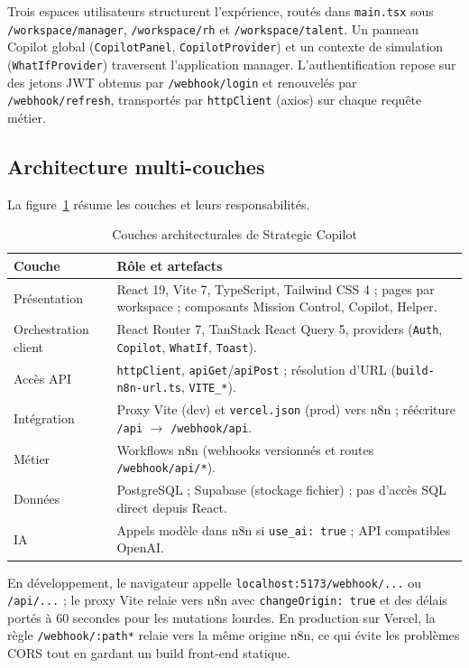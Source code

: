Trois espaces utilisateurs structurent l'expérience, routés dans \texttt{main.tsx} sous \texttt{/workspace/manager}, \texttt{/workspace/rh} et \texttt{/workspace/talent}. Un panneau Copilot global (\texttt{CopilotPanel}, \texttt{CopilotProvider}) et un contexte de simulation (\texttt{WhatIfProvider}) traversent l'application manager. L'authentification repose sur des jetons JWT obtenus par \texttt{/webhook/login} et renouvelés par \texttt{/webhook/refresh}, transportés par \texttt{httpClient} (axios) sur chaque requête métier.

\subsection{Architecture multi-couches}

La figure~\ref{tab:arch-couches} résume les couches et leurs responsabilités.

\begin{table}[htbp]
\centering
\caption{Couches architecturales de Strategic Copilot}
\label{tab:arch-couches}
\begin{tabular}{@{}p{2.8cm}p{9.2cm}@{}}
\toprule
\textbf{Couche} & \textbf{Rôle et artefacts} \\
\midrule
Présentation & React 19, Vite 7, TypeScript, Tailwind CSS 4 ; pages par workspace ; composants Mission Control, Copilot, Helper. \\
Orchestration client & React Router 7, TanStack React Query 5, providers (\texttt{Auth}, \texttt{Copilot}, \texttt{WhatIf}, \texttt{Toast}). \\
Accès API & \texttt{httpClient}, \texttt{apiGet}/\texttt{apiPost} ; résolution d'URL (\texttt{build-n8n-url.ts}, \texttt{VITE\_*}). \\
Intégration & Proxy Vite (dev) et \texttt{vercel.json} (prod) vers n8n ; réécriture \texttt{/api} $\rightarrow$ \texttt{/webhook/api}. \\
Métier & Workflows n8n (webhooks versionnés et routes \texttt{/webhook/api/*}). \\
Données & PostgreSQL ; Supabase (stockage fichier) ; pas d'accès SQL direct depuis React. \\
IA & Appels modèle dans n8n si \texttt{use\_ai: true} ; API compatibles OpenAI. \\
\bottomrule
\end{tabular}
\end{table}

En développement, le navigateur appelle \texttt{localhost:5173/webhook/...} ou \texttt{/api/...} ; le proxy Vite relaie vers n8n avec \texttt{changeOrigin: true} et des délais portés à 60 secondes pour les mutations lourdes. En production sur Vercel, la règle \texttt{/webhook/:path*} relaie vers la même origine n8n, ce qui évite les problèmes CORS tout en gardant un build front-end statique.

